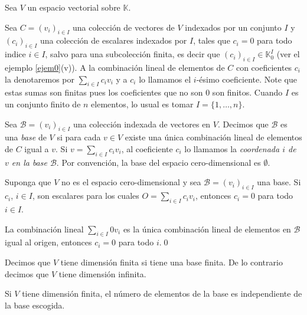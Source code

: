 Sea $V$ un espacio vectorial sobre $\mathbb{K}$. 

\begin{nota}
Sea $C=(v_i)_{i\in I}$ una colección de vectores de $V$ indexados por un conjunto $I$ y $(c_i)_{i\in I}$ una colección de escalares indexados por $I$, tales que $c_i=0$ para todo indice $i\in I$, salvo para una subcolecci\'on finita, es decir que $(c_i)_{i\in I}\in \mathbb{K}^I_0$ (ver el ejemplo \ref{ejem0}(v)). A la combinación lineal de elementos de $C$ con coeficientes $c_i$ la denotaremos por $\sum_{i\in I} c_iv_i$ y a $c_i$ lo llamamos el $i$-ésimo coeficiente. Note que estas sumas son finitas pues los coeficientes que no son $0$ son finitos. Cuando $I$ es un conjunto finito de $n$ elementos, lo usual es tomar $I=\{1,\ldots,n\}$.
\end{nota}

\begin{defn}
Sea $\mathcal{B}=(v_i)_{i\in I}$ una colección indexada de vectores en $V$. Decimos que $\mathcal{B}$ es una \emph{base} de $V$ si para cada $v\in V$ existe una \'unica combinaci\'on lineal de elementos de $C$ igual a $v$. Si $v=\sum_{i\in I} c_iv_i$, al coeficiente $c_i$ lo llamamos la \emph{coordenada $i$ de $v$ en la base $\mathcal{B}$}. Por convenci\'on, la base del espacio cero-dimensional es $\emptyset$. 
\end{defn}

\begin{lema}\label{lemabas}
Suponga que $V$ no es el espacio cero-dimensional y sea $\mathcal{B}=(v_i)_{i\in I}$ una base. Si $c_i$, $i\in I$, son escalares para los cuales $O=\sum_{i\in I}c_iv_i$, entonces $c_i=0$ para todo $i\in I$.
\end{lema}

\dem La combinaci\'on lineal $\sum_{i\in I}0v_i$ es la \'unica combinaci\'on lineal de elementos en $\mathcal{B}$ igual al origen, entonces $c_i=0$ para todo $i$.\qed 


\begin{defn}
Decimos que $V$ tiene dimensi\'on finita si tiene una base finita. De lo contrario decimos que $V$ tiene dimensi\'on infinita.
\end{defn}

\begin{teo} \label{basedim}
Si $V$ tiene dimensi\'on finita, el n\'umero de elementos de la base es independiente de la base escogida.
\end{teo}

